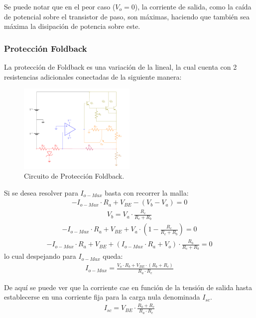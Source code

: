 Se puede notar que en el peor caso ($V_o = 0$), la corriente de salida, como la caída de potencial sobre el transistor de paso, son máximas, haciendo que también sea máxima la disipación de potencia sobre este.

\subsubsection{Protección Foldback}
La protección de Foldback es una variación de la lineal, la cual cuenta con 2 resistencias adicionales conectadas de la siguiente manera:
\begin{figure}[H]
\centering
	\includegraphics[width=0.5\textwidth, page=2]{ImagenesEjercicio2/Regulador.pdf}
	\caption{Circuito de Protección Foldback.}
	\label{fig:circuitofoldback}
\end{figure}
Si se desea resolver para $I_{o-Max}$ basta con recorrer la malla:
\begin{align}
-I_{o-Max} \cdot R_a + V_{BE} - (V_b-V_a)=0
\end{align}
\begin{align}
V_b=V_a \cdot \frac{R_c}{R_c+R_b}
\end{align}
\begin{align}
-I_{o-Max} \cdot R_a + V_{BE} + V_a \cdot (1-\frac{R_c}{R_c+R_b})=0
\end{align}
\begin{align}
-I_{o-Max} \cdot R_a + V_{BE} + (I_{o-Max} \cdot R_a +V_o) \cdot \frac{R_b}{R_c+R_b}=0
\end{align}
lo cual despejando para $I_{o-Max}$ queda:
\begin{align}
I_{o-Max}=  \frac{V_o \cdot R_b + V_{BE}\cdot (R_b+R_c)}{R_a \cdot R_c}
\label{eq:Imaxfoldback}
\end{align}

De aquí se puede ver que la corriente cae en función de la tensión de salida hasta establecerse en una corriente fija para la carga nula denominada $I_{sc}$.
\begin{align}
I_{sc} = V_{BE} \cdot \frac{R_b+R_c}{R_a \cdot R_c}
\label{eq:Isc}
\end{align}

